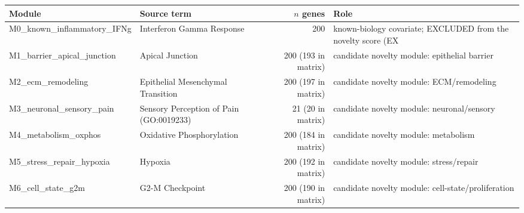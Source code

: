 \begin{longtable}{p{}p{}rp{}}
\hline\hline Module & Source term & $n$ genes & Role \\
\hline\endhead
M0\_known\_inflammatory\_IFNg & Interferon Gamma Response & 200 & known-biology covariate; EXCLUDED from the novelty score (EX \\
M1\_barrier\_apical\_junction & Apical Junction & 200 (193 in matrix) & candidate novelty module: epithelial barrier \\
M2\_ecm\_remodeling & Epithelial Mesenchymal Transition & 200 (197 in matrix) & candidate novelty module: ECM/remodeling \\
M3\_neuronal\_sensory\_pain & Sensory Perception of Pain (GO:0019233) & 21 (20 in matrix) & candidate novelty module: neuronal/sensory \\
M4\_metabolism\_oxphos & Oxidative Phosphorylation & 200 (184 in matrix) & candidate novelty module: metabolism \\
M5\_stress\_repair\_hypoxia & Hypoxia & 200 (192 in matrix) & candidate novelty module: stress/repair \\
M6\_cell\_state\_g2m & G2-M Checkpoint & 200 (190 in matrix) & candidate novelty module: cell-state/proliferation \\
\hline\hline\end{longtable}
